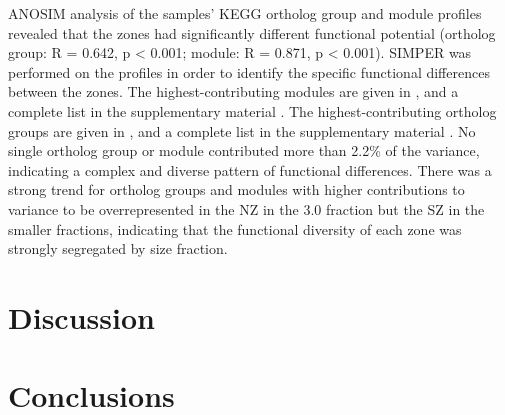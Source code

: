 \ac{ANOSIM} analysis of the samples' \ac{KEGG} ortholog group and module profiles revealed that the zones had significantly different functional potential (ortholog group: R = 0.642, p < 0.001; module: R = 0.871, p < 0.001). 
\ac{SIMPER} was performed on the profiles in order to identify the specific functional differences between the zones. 
The highest-contributing modules are given in , and a complete list in the supplementary material .
The highest-contributing ortholog groups are given in , and a complete list in the supplementary material .
No single ortholog group or module contributed more than 2.2\% of the variance, indicating a complex and diverse pattern of functional differences. 
There was a strong trend for ortholog groups and modules with higher contributions to variance to be overrepresented in the \ac{NZ} in the 3.0 \micron{} fraction but the \ac{SZ} in the smaller fractions, indicating that the functional diversity of each zone was strongly segregated by size fraction.




\section{Discussion}

\section{Conclusions}

